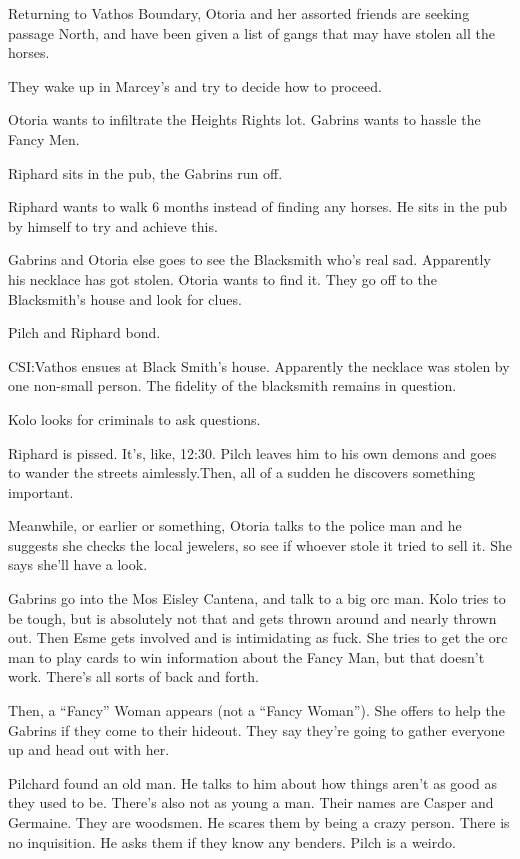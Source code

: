 \documentclass[letterpaper,10pt,twoside,twocolumn,openany]{book}
\begin{document}
Returning to Vathos Boundary, Otoria and her assorted friends are seeking passage North, and have been given a list of gangs that may have stolen all the horses.

They wake up in Marcey’s and try to decide how to proceed.

Otoria wants to infiltrate the Heights Rights lot. Gabrins wants to hassle the Fancy Men.

Riphard sits in the pub, the Gabrins run off.

Riphard wants to walk 6 months instead of finding any horses. He sits in the pub by himself to try and achieve this.

Gabrins and Otoria else goes to see the Blacksmith who’s real sad. Apparently his necklace has got stolen. Otoria wants to find it. They go off to the Blacksmith’s house and look for clues.

Pilch and Riphard bond.

CSI:Vathos ensues at Black Smith’s house. Apparently the necklace was stolen by one non-small person. The fidelity of the blacksmith remains in question.

Kolo looks for criminals to ask questions.

Riphard is pissed. It’s, like, 12:30. Pilch leaves him to his own demons and goes to wander the streets aimlessly.Then, all of a sudden he discovers something important.

Meanwhile, or earlier or something, Otoria talks to the police man and he suggests she checks the local jewelers, so see if whoever stole it tried to sell it. She says she’ll have a look.

Gabrins go into the Mos Eisley Cantena, and talk to a big orc man. Kolo tries to be tough, but is absolutely not that and gets thrown around and nearly thrown out. Then Esme gets involved and is intimidating as fuck. She tries to get the orc man to play cards to win information about the Fancy Man, but that doesn’t work. There’s all sorts of back and forth.

Then, a “Fancy” Woman appears (not a “Fancy Woman”). She offers to help the Gabrins if they come to their hideout. They say they’re going to gather everyone up and head out with her.

Pilchard found an old man. He talks to him about how things aren’t as good as they used to be. There’s also not as young a man. Their names are Casper and Germaine. They are woodsmen. He scares them by being a crazy person. There is no inquisition. He asks them if they know any benders. Pilch is a weirdo.
\end{document}
